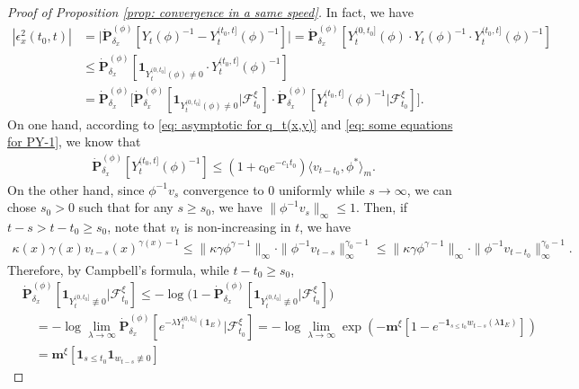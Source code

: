 \documentclass[12pt, a4paper]{amsart}
\theoremstyle{definition}
\numberwithin{equation}{section}
\begin{document}
\begin{proof}[Proof of Proposition \ref{prop: convergence in a same speed}]
	In fact, we have
\[\label{eq:epsilon-2}\begin{split}
	|\epsilon_x^2(t_0,t)|
	&= \big| \dot{\mathbf P}_{\delta_x}^{(\phi)}[Y_t(\phi)^{-1} - Y^{(t_0,t]}_t(\phi)^{-1}] \big|
	= \dot{\mathbf P}_{\delta_x}^{(\phi)}[Y_t^{(0,t_0]}(\phi)\cdot Y_t(\phi)^{-1}\cdot Y^{(t_0,t]}_t(\phi)^{-1}]
	\\&\leq \dot{\mathbf P}_{\delta_x}^{(\phi)}[\mathbf 1_{Y_t^{(0,t_0]}(\phi)\neq 0}\cdot Y^{(t_0,t]}_t(\phi)^{-1}]
	\\&= \dot{\mathbf P}_{\delta_x}^{(\phi)} \big[\dot{\mathbf P}_{\delta_x}^{(\phi)}[\mathbf 1_{Y_t^{(0,t_0]}(\phi)\neq 0}|\mathscr F^\xi_{t_0}] \cdot \dot{\mathbf P}_{\delta_x}^{(\phi)} [ Y^{(t_0,t]}_t(\phi)^{-1}|\mathscr F^\xi_{t_0}] \big].
\end{split}\]
	On one hand, according to \eqref{eq: asymptotic for q_t(x,y)} and \eqref{eq: some equations for PY-1}, we know that
\[\label{eq:epsilon-2-final}\begin{split}
	\dot{\mathbf P}_{\delta_x}^{(\phi)}[ Y^{(t_0,t]}_t(\phi)^{-1}]
	\leq (1+c_0 e^{-c_1 t_0}) \langle v_{t-t_0},\phi^* \rangle_m.
\end{split}\]
	On the other hand, since $\phi^{-1}v_s$ convergence to $0$ uniformly while $s\to \infty$, we can chose  $s_0>0$ such that for any $s\geq s_0$, we have $\|\phi^{-1}v_s\|_{\infty} \leq 1$.
	Then, if $t-s > t-t_0 \geq s_0$, note that $v_t$ is non-increasing in $t$, we have
\[\begin{split}
	\kappa(x)\gamma(x) v_{t-s}(x)^{\gamma(x)-1}
	\leq \|\kappa \gamma \phi^{\gamma - 1}\|_\infty \cdot \|\phi^{-1} v_{t-s}\|^{\gamma_0-1}_\infty
	\leq \|\kappa\gamma\phi^{\gamma - 1}\|_\infty \cdot \|\phi^{-1}v_{t-t_0}\|^{\gamma_0-1}_\infty.
\end{split}\]
	Therefore, by Campbell's formula, while $t-t_0 \geq s_0$,
\[\label{eq:firstpart-of-Y}\begin{split}
	&\dot{\mathbf P}_{\delta_x}^{(\phi)}[\mathbf 1_{Y_t^{(0,t_0]}\not \equiv  0}|\mathscr F^\xi_{t_0}]
	\leq - \log \big( 1- \dot{\mathbf P}_{\delta_x}^{(\phi)}[\mathbf 1_{Y_t^{(0,t_0]}\not \equiv  0}|\mathscr F^\xi_{t_0}]\big)
	\\&\quad =  - \log \lim_{\lambda \to \infty}\dot{\mathbf P}_{\delta_x}^{(\phi)}[e^{- \lambda Y_t^{(0,t_0]}(\mathbf 1_E) }|\mathscr F^\xi_{t_0}]
	= -\log \lim_{\lambda \to \infty}
	\exp(- \mathbf m^\xi [ 1-e^{- \mathbf 1_{s\leq t_0} w_{t-s}(\lambda \mathbf 1_E)}  ])
	\\&\quad = \mathbf m^\xi [\mathbf 1_{s\leq t_0} \mathbf 1_{w_{t-s} \not \equiv 0}]

\end{split}\]
\end{proof}
\end{document}
